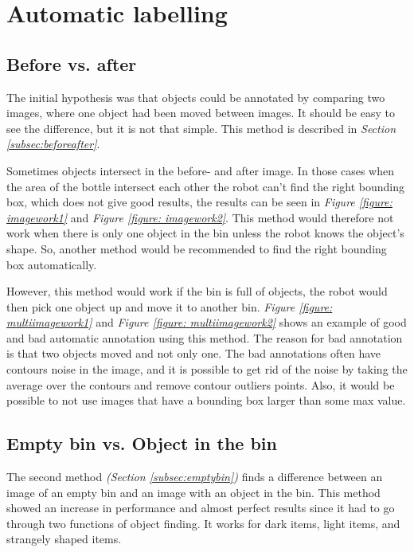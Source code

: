 \section{Automatic labelling}
\subsection{Before vs. after}
The initial hypothesis was that objects could be annotated by comparing two images, where one object had been moved between images. It should be easy to see the difference, but it is not that simple. This method is described in \textit{Section \ref{subsec:beforeafter}}.

Sometimes objects intersect in the before- and after image. In those cases when the area of the bottle intersect each other the robot can't find the right bounding box, which does not give good results, the results can be seen in \textit{Figure \ref{figure: imagework1}} and \textit{Figure \ref{figure: imagework2}}. This method would therefore not work when there is only one object in the bin unless the robot knows the object's shape. So, another method would be recommended to find the right bounding box automatically. 

However, this method would work if the bin is full of objects, the robot would then pick one object up and move it to another bin. \textit{Figure \ref{figure: multiimagework1}} and \textit{Figure \ref{figure: multiimagework2}} shows an example of good and bad automatic annotation using this method. The reason for bad annotation is that two objects moved and not only one. The bad annotations often have contours noise in the image, and it is possible to get rid of the noise by taking the average over the contours and remove contour outliers points. Also, it would be possible to not use images that have a bounding box larger than some max value. 

\subsection{Empty bin vs. Object in the bin}
The second method \textit{(Section \ref{subsec:emptybin})} finds a difference between an image of an empty bin and an image with an object in the bin. 
This method showed an increase in performance and almost perfect results since it had to go through two functions of object finding. It works for dark items, light items, and strangely shaped items. 

